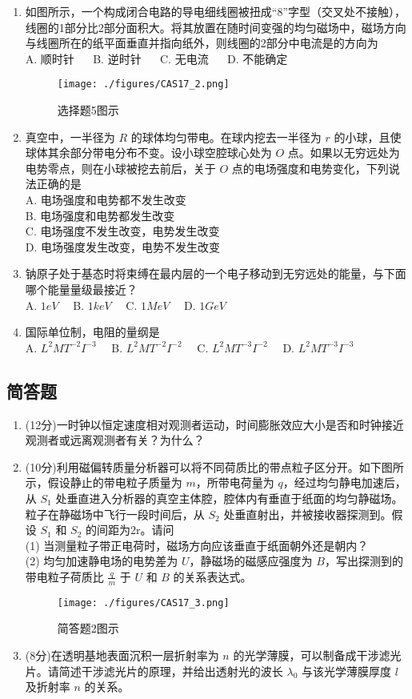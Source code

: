 \begin{enumerate}
\item 如图所示，一个构成闭合电路的导电细线圈被扭成“8”字型（交叉处不接触），线圈的1部分比2部分面积大。将其放置在随时间变强的均匀磁场中，磁场方向与线圈所在的纸平面垂直并指向纸外，则线圈的2部分中电流是的方向为\\
A. 顺时针 $\quad$
B. 逆时针 $\quad$
C. 无电流 $\quad$
D. 不能确定 $\quad$
\begin{figure}[ht]
\centering
\texttt{[image: ./figures/CAS17\_2.png]}
\caption{选择题5图示} \label{CAS17_fig2}
\end{figure}
\item 真空中，一半径为 $R$ 的球体均匀带电。在球内挖去一半径为 $r$ 的小球，且使球体其余部分带电分布不变。设小球空腔球心处为 $O$ 点。如果以无穷远处为电势零点，则在小球被挖去前后，关于 $O$ 点的电场强度和电势变化，下列说法正确的是\\
A. 电场强度和电势都不发生改变 \\
B. 电场强度和电势都发生改变 \\
C. 电场强度不发生改变，电势发生改变 \\
D. 电场强度发生改变，电势不发生改变 \\
\item 钠原子处于基态时将束缚在最内层的一个电子移动到无穷远处的能量，与下面哪个能量量级最接近？\\
A. $1eV\quad$
B. $1keV\quad$
C. $1MeV\quad$
D. $1GeV\quad$
\item 国际单位制，电阻的量纲是\\
A. $L^{2}MT^{-2}I^{-3}\quad$
B. $L^{2}MT^{-2}I^{-2}\quad$
C. $L^{2}MT^{-3}I^{-2}\quad$
D. $L^{2}MT^{-3}I^{-3}\quad$
\end{enumerate}
\subsection{简答题}
\begin{enumerate}
\item (12分)一时钟以恒定速度相对观测者运动，时间膨胀效应大小是否和时钟接近观测者或远离观测者有关？为什么？
\item (10分)利用磁偏转质量分析器可以将不同荷质比的带点粒子区分开。如下图所示，假设静止的带电粒子质量为 $m$，所带电荷量为 $q$，经过均匀静电加速后，从 $S_{1}$ 处垂直进入分析器的真空主体腔，腔体内有垂直于纸面的均匀静磁场。粒子在静磁场中飞行一段时间后，从 $S_{2}$ 处垂直射出，并被接收器探测到。假设 $S_{1}$ 和 $S_{2}$ 的间距为2r。请问\\
(1) 当测量粒子带正电荷时，磁场方向应该垂直于纸面朝外还是朝内？\\
(2) 均匀加速静电场的电势差为 $U$，静磁场的磁感应强度为 $B$，写出探测到的带电粒子荷质比 $\frac{q}{m}$ 于 $U$ 和 $B$ 的关系表达式。\\
\begin{figure}[ht]
\centering
\texttt{[image: ./figures/CAS17\_3.png]}
\caption{简答题2图示} \label{CAS17_fig3}
\end{figure}
\item (8分)在透明基地表面沉积一层折射率为 $n$ 的光学薄膜，可以制备成干涉滤光片。请简述干涉滤光片的原理，并给出透射光的波长 $\lambda_{0}$ 与该光学薄膜厚度 $l$ 及折射率 $n$ 的关系。
\end{enumerate}
